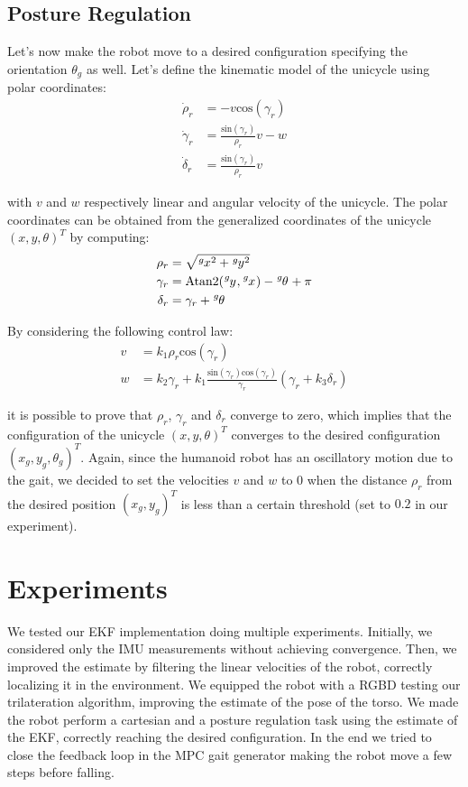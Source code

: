 \documentclass[a4paper]{article}
\begin{document}
\subsection{Posture Regulation}
\label{subsec:posture_regulation}
Let's now make the robot move to a desired configuration specifying the
orientation $\theta_g$ as well.
Let's define the kinematic model of the unicycle using
polar coordinates:
\begin{align}
    \dot{\rho}_r &= -v \text{cos}(\gamma_r) \\
    \dot{\gamma}_r &= \frac{\text{sin}(\gamma_r)}{\rho_r}v - w \\
    \dot{\delta}_r &= \frac{\text{sin}(\gamma_r)}{\rho_r}v
\end{align}

\noindent with $v$ and $w$ respectively linear and angular velocity of the
unicycle. The polar coordinates can be obtained from the generalized
coordinates of the unicycle $(x, y, \theta)^T$ by computing:
\begin{align}
    \rho_r &= \sqrt{\tensor[^g]{x}{^2} + \tensor[^g]{y}{^2}} \\
    \gamma_r &= \text{Atan2}(\tensor[^g]{y}{}, \tensor[^g]{x}{}) - \tensor[^g]{\theta}{} + \pi \\
    \delta_r &= \gamma_r + \tensor[^g]{\theta}{}
\end{align}

By considering the following control law:
\begin{align}
    \label{eq:posture-regulation-control-law-v}
    v &= k_1 \rho_r \text{cos}(\gamma_r) \\
    \label{eq:posture-regulation-control-law-w}
    w &= k_2 \gamma_r + k_1 \frac{\text{sin}(\gamma_r) \text{cos}(\gamma_r)}{\gamma_r}(\gamma_r + k_3 \delta_r)
\end{align}

\noindent it is possible to prove\cite{Siciliano:2008:RMP:1524151}
that $\rho_r$, $\gamma_r$ and $\delta_r$ converge to zero, which implies that
the configuration of the unicycle $(x, y, \theta)^T$ converges to the desired
configuration $(x_g, y_g, \theta_g)^T$.
Again, since the humanoid robot has an oscillatory motion due to the
gait, we decided to set the velocities $v$ and $w$ to $0$ when the distance $\rho_r$
from the desired position $(x_g, y_g)^T$ is less than a certain threshold (set
to $0.2$ in our experiment).

\section{Experiments}
We tested our EKF implementation doing multiple experiments. Initially, we
considered only the IMU measurements without achieving convergence. Then,
we improved the estimate by filtering the linear velocities of the robot,
correctly localizing it in the environment.
We equipped the robot with a RGBD testing our trilateration algorithm,
improving the estimate of the pose of the torso. We made the robot perform
a cartesian and a posture regulation task using the estimate of the EKF,
correctly reaching the desired configuration.
In the end we tried to close the feedback loop in the MPC gait generator
making the robot move a few steps before falling.
\end{document}
